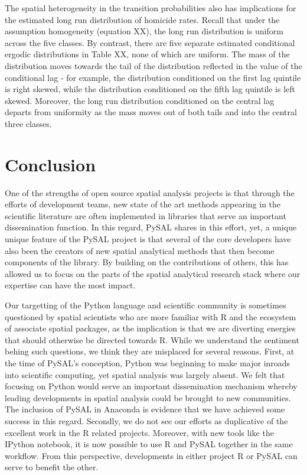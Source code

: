 \documentclass[11pt, titlepage]{article}
\begin{document}
The spatial heterogeneity in the transition probabilities also has
implications for the estimated long run distribution of homicide rates.
Recall that under the assumption homogeneity (equation XX), the long run
distribution is uniform across the five classes. By contrast, there are
five separate estimated conditional ergodic distributions in Table XX,
none of which are uniform. The mass of the distribution moves towards
the tail of the distribution reflected in the value of the conditional
lag - for example, the distribution conditioned on the first lag
quintile is right skewed, while the distribution conditioned on the
fifth lag quintile is left skewed. Moreover, the long run distribution
conditioned on the central lag departs from uniformity as the mass moves
out of both tails and into the central three classes.

\section{Conclusion}

One of the strengths of open source spatial analysis projects is that
through the efforts of development teams, new state of the art methods
appearing in the scientific literature are often implemented in
libraries that serve an important dissemination function. In this
regard, PySAL shares in this effort, yet, a unique unique feature of the
PySAL project is that several of the core developers have also been the
creators of new spatial analytical methods that then become components
of the library. By building on the contributions of others, this has
allowed us to focus on the parts of the spatial analytical research
stack where our expertise can have the most impact.

Our targetting of the Python language and scientific community is
sometimes questioned by spatial scientists who are more familiar with R
and the ecosystem of associate spatial packages, as the implication is
that we are diverting energies that should otherwise be directed towards
R. While we understand the sentiment behing such questions, we think
they are misplaced for several reasons. First, at the time of PySAL's
conception, Python was beginning to make major inroads into scientific
computing, yet spatial analysis was largely absent. We felt that
focusing on Python would serve an important dissemination mechanism
whereby leading developments in spatial analysis could be brought to new
communities. The inclusion of PySAL in Anaconda is evidence that we have
achieved some success in this regard. Secondly, we do not see our
efforts as duplicative of the excellent work in the R related projects.
Moreover, with new tools like the IPython notebook, it is now possible
to use R and PySAL together in the same workflow. From this perspective,
developments in either project R or PySAL can serve to benefit the
other.
\end{document}
